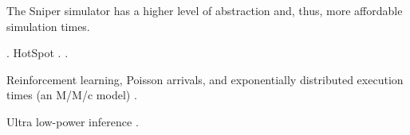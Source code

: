 The Sniper simulator has a higher level of abstraction \cite{carlson2011} and,
thus, more affordable simulation times.

 \cite{li2009}.
HotSpot \cite{skadron2004}.
 \cite{sridhar2010}.

Reinforcement learning, Poisson arrivals, and exponentially distributed
execution times (an M/M/c model) \cite{lu2015}.

Ultra low-power inference \cite{park2015}.
